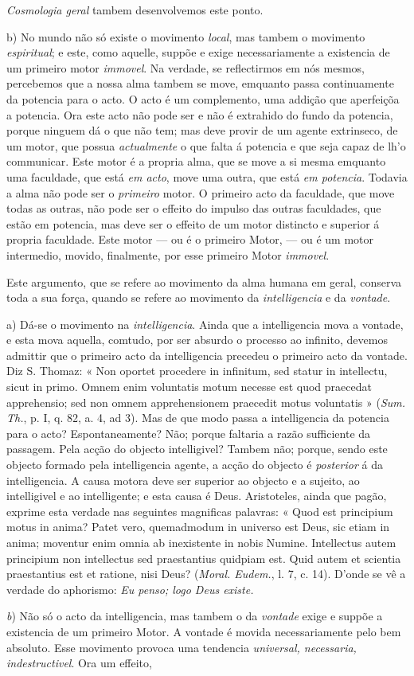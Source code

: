 \emph{Cosmologia geral} tambem desenvolvemos este ponto.\par b) No mundo não só existe o movimento \emph{local}, mas tambem o movimento \emph{espiritual}; e este, como aquelle, suppõe e exige necessariamente a existencia de um primeiro motor \emph{immovel}. Na verdade, se reflectirmos em nós mesmos, percebemos que a nossa alma tambem se move, emquanto passa continuamente da potencia para o acto. O acto é um complemento, uma addição que aperfeiçõa a potencia. Ora este acto não pode ser e não é extrahido do fundo da potencia, porque ninguem dá o que não tem; mas deve provir de um agente extrinseco, de um motor, que possua \emph{actualmente} o que falta á potencia e que seja capaz de lh'o communicar. Este motor é a propria alma, que se move a si mesma emquanto uma faculdade, que está \emph{em acto}, move uma outra, que está \emph{em potencia}. Todavia a alma não pode ser o \emph{primeiro} motor. O primeiro acto da faculdade, que move todas as outras, não pode ser o effeito do impulso das outras faculdades, que estão em potencia, mas deve ser o effeito de um motor distincto e superior á propria faculdade. Este motor --- ou é o primeiro Motor, --- ou é um motor intermedio, movido, finalmente, por esse primeiro Motor \emph{immovel}.\par Este argumento, que se refere ao movimento da alma humana em geral, conserva toda a sua força, quando se refere ao movimento da \emph{intelligencia} e da \emph{vontade}.\par a) Dá-se o movimento na \emph{intelligencia}. Ainda que a intelligencia mova a vontade, e esta mova aquella, comtudo, por ser absurdo o processo ao infinito, devemos admittir que o primeiro acto da intelligencia precedeu o primeiro acto da vontade. Diz S. Thomaz: « Non oportet procedere in infinitum, sed statur in intellectu, sicut in primo. Omnem enim voluntatis motum necesse est quod praecedat apprehensio; sed non omnem apprehensionem praecedit motus voluntatis » (\emph{Sum. Th.}, p. I, q. 82, a. 4, ad 3). Mas de que modo passa a intelligencia da potencia para o acto? Espontaneamente? Não; porque faltaria a razão sufficiente da passagem. Pela acção do objecto intelligivel? Tambem não; porque, sendo este objecto formado pela intelligencia agente, a acção do objecto é \emph{posterior} á da intelligencia. A causa motora deve ser superior ao objecto e a sujeito, ao intelligivel e ao intelligente; e esta causa é Deus. Aristoteles, ainda que pagão, exprime esta verdade nas seguintes magnificas palavras: « Quod est principium motus in anima? Patet vero, quemadmodum in universo est Deus, sic etiam in anima; moventur enim omnia ab inexistente in nobis Numine. Intellectus autem principium non intellectus sed praestantius quidpiam est. Quid autem et scientia praestantius est et ratione, nisi Deus? (\emph{Moral. Eudem.}, l. 7, c. 14). D'onde se vê a verdade do aphorismo: \emph{Eu penso; logo Deus existe.}\par \emph{b}) Não só o acto da intelligencia, mas tambem o da \emph{vontade} exige e suppõe a existencia de um primeiro Motor. A vontade é movida necessariamente pelo bem absoluto. Esse movimento provoca uma tendencia \emph{universal, necessaria, indestructivel}. Ora um effeito, 